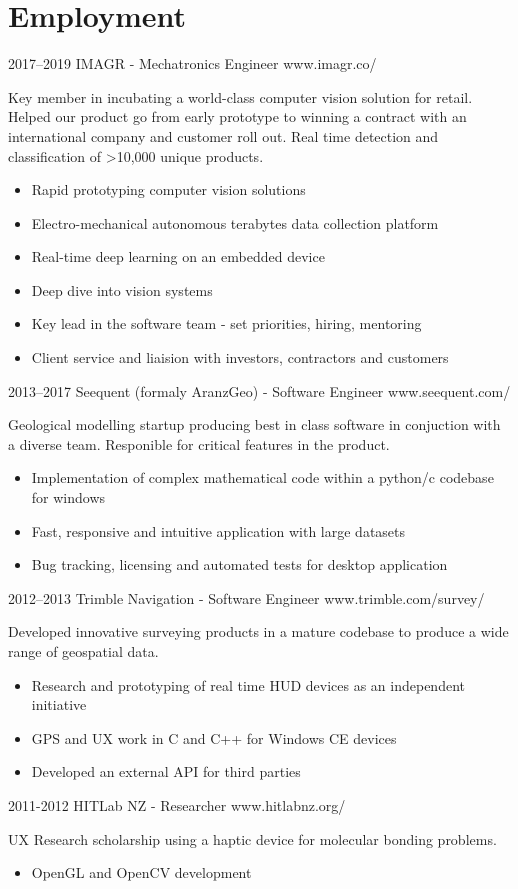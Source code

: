 \documentclass[print]{friggeri-cv} %
\begin{document}
\section{Employment}
\begin{entrylist}
\entry
{2017--2019}
{IMAGR - Mechatronics Engineer}
{www.imagr.co/}
{Key member in incubating a world-class computer vision solution for retail. Helped our product go from early prototype to winning a contract with an international company and customer roll out. Real time detection and classification of >10,000 unique products.
\begin{itemize}
\item Rapid prototyping computer vision solutions
\item Electro-mechanical autonomous terabytes data collection platform
\item Real-time deep learning on an embedded device
\item Deep dive into vision systems
\item Key lead in the software team - set priorities, hiring, mentoring
\item Client service and liaision with investors, contractors and customers
\end{itemize}}

\entry
{2013--2017}
{Seequent (formaly AranzGeo) - Software Engineer}
{www.seequent.com/}
{Geological modelling startup producing best in class software in conjuction with a diverse team. Responible for critical features in the product.
\begin{itemize}
\item Implementation of complex mathematical code within a python/c codebase for windows
\item Fast, responsive and intuitive application with large datasets
\item Bug tracking, licensing and automated tests for desktop application
\end{itemize}}

\entry
{2012--2013}
{Trimble Navigation - Software Engineer}
{www.trimble.com/survey/}
{Developed innovative surveying products in a mature codebase to produce a wide range of geospatial data.
\begin{itemize}
\item Research and prototyping of real time HUD devices as an independent initiative
\item GPS and UX work in C and C++ for Windows CE devices
\item Developed an external API for third parties
\end{itemize}}

\entry
{2011-2012}
{HITLab NZ - Researcher}
{www.hitlabnz.org/}
{UX Research scholarship using a haptic device for molecular bonding problems.
\begin{itemize}
\item OpenGL and OpenCV development
\end{itemize}}
\end{entrylist}\\ 
\end{document}
